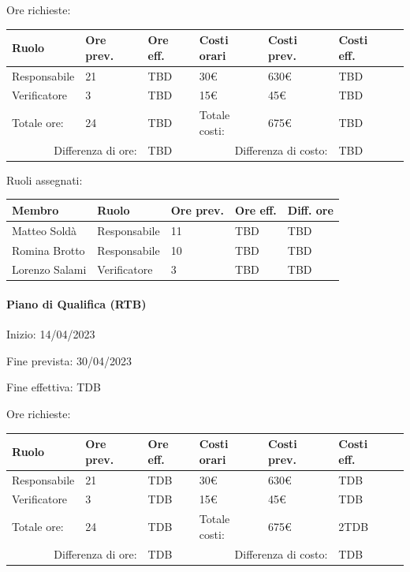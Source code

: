 \documentclass[a4paper, 12pt]{article}
\begin{document}
Ore richieste:\\[0.5em]
\begin{tabular}{|l|l|l||l|l|l|l|}\hline
Ruolo & Ore prev. & Ore eff. & Costi orari & Costi prev. & Costi eff.\\\hline
Responsabile & 21 & TBD & 30\euro & 630\euro & TBD \\\hline
Verificatore & 3 & TBD & 15\euro & 45\euro & TBD \\\hline
Totale ore: & 24 & TBD & Totale costi: & 675\euro & TBD \\\hline
\multicolumn{2}{|r|}{Differenza di ore:} & TBD & \multicolumn{2}{r|}{Differenza di costo:} & TBD \\\hline
\end{tabular}

Ruoli assegnati:\\[0.5em]
\begin{tabular}{|l|l|l|l|l|}\hline
Membro & Ruolo & Ore prev. & Ore eff. & Diff. ore \\\hline
Matteo Soldà & Responsabile & 11 & TBD & TBD \\\hline
Romina Brotto & Responsabile & 10 & TBD & TBD \\\hline
Lorenzo Salami & Verificatore & 3 & TBD & TBD \\\hline
\end{tabular}

\paragraph{Piano di Qualifica (RTB)}
Inizio: 14/04/2023\par
Fine prevista: 30/04/2023\par
Fine effettiva: TDB

Ore richieste:\\[0.5em]
\begin{tabular}{|l|l|l||l|l|l|l|}\hline
Ruolo & Ore prev. & Ore eff. & Costi orari & Costi prev. & Costi eff.  \\\hline
Responsabile & 21 & TDB & 30\euro & 630\euro & TDB \\\hline
Verificatore & 3 & TDB & 15\euro & 45\euro & TDB \\\hline
Totale ore: & 24 & TDB & Totale costi: & 675\euro & 2TDB \\\hline
\multicolumn{2}{|r|}{Differenza di ore:} & TDB & \multicolumn{2}{r|}{Differenza di costo:} & TDB \\\hline
\end{tabular}
\end{document}
